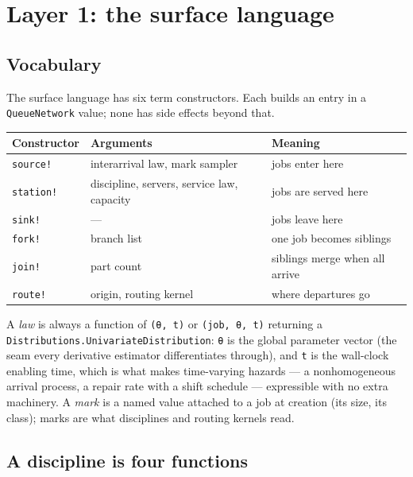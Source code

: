 \documentclass[11pt]{article}
\newcommand{\code}[1]{\texttt{#1}}
\begin{document}
\section{Layer 1: the surface language}

\subsection{Vocabulary}

The surface language has six term constructors. Each builds an entry in a
\code{QueueNetwork} value; none has side effects beyond that.

\begin{center}
\small
\begin{tabular}{@{}lll@{}}
\toprule
Constructor & Arguments & Meaning \\
\midrule
\code{source!} & interarrival law, mark sampler & jobs enter here \\
\code{station!} & discipline, servers, service law, capacity & jobs are served here \\
\code{sink!} & --- & jobs leave here \\
\code{fork!} & branch list & one job becomes siblings \\
\code{join!} & part count & siblings merge when all arrive \\
\code{route!} & origin, routing kernel & where departures go \\
\bottomrule
\end{tabular}
\end{center}

A \emph{law} is always a function of \code{(θ, t)} or \code{(job, θ, t)}
returning a \code{Distributions.UnivariateDistribution}: \code{θ} is the global
parameter vector (the seam every derivative estimator differentiates through),
and \code{t} is the wall-clock enabling time, which is what makes time-varying
hazards --- a nonhomogeneous arrival process, a repair rate with a shift
schedule --- expressible with no extra machinery. A \emph{mark} is a named
value attached to a job at creation (its size, its class); marks are what
disciplines and routing kernels read.

\subsection{A discipline is four functions}
\label{sec:discipline}
\end{document}

